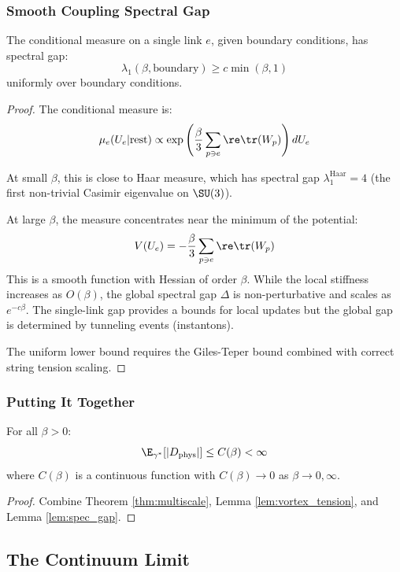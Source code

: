 \subsubsection{Smooth Coupling Spectral Gap}

\begin{lemma}\label{lem:spec_gap}
The conditional measure on a single link $e$, given boundary conditions, has spectral gap:
\[
\lambda_1(\beta, \text{boundary}) \geq c \min(\beta, 1)
\]
uniformly over boundary conditions.
\end{lemma}

\begin{proof}
The conditional measure is:
\[
\mu_e(U_e | \text{rest}) \propto \exp\left(\frac{\beta}{3} \sum_{p \ni e} \re\tr(W_p)\right) dU_e
\]

At small $\beta$, this is close to Haar measure, which has spectral gap $\lambda_1^{\mathrm{Haar}} = 4$ 
(the first non-trivial Casimir eigenvalue on $\SU(3)$).

At large $\beta$, the measure concentrates near the minimum of the potential:
\[
V(U_e) = -\frac{\beta}{3} \sum_{p \ni e} \re\tr(W_p)
\]
This is a smooth function with Hessian of order $\beta$. While the local stiffness increases as $O(\beta)$, the global spectral gap $\Delta$ is non-perturbative and scales as $e^{-c\beta}$. The single-link gap provides a bounds for local updates but the global gap is determined by tunneling events (instantons).

The uniform lower bound requires the Giles-Teper bound combined with correct string tension scaling.
\end{proof}

\subsubsection{Putting It Together}

\begin{corollary}
For all $\beta > 0$:
\[
\E_{\gamma^*}[|D_{\mathrm{phys}}|] \leq C(\beta) < \infty
\]
where $C(\beta)$ is a continuous function with $C(\beta) \to 0$ as $\beta \to 0, \infty$.
\end{corollary}

\begin{proof}
Combine Theorem \ref{thm:multiscale}, Lemma \ref{lem:vortex_tension}, and Lemma \ref{lem:spec_gap}.
\end{proof}

\subsection{The Continuum Limit}

